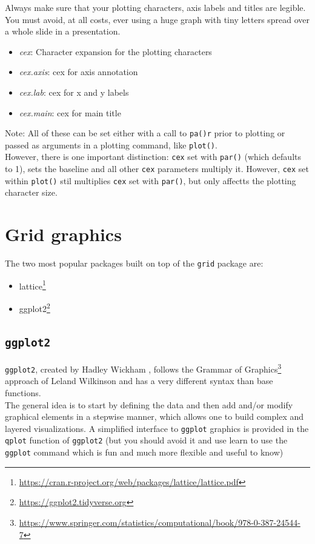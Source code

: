 \documentclass[
]{book}
\providecommand{\tightlist}{%
  \setlength{\itemsep}{0pt}\setlength{\parskip}{0pt}}
\renewcommand{\href}[2]{#2\footnote{\url{#1}}}
\begin{document}
Always make sure that your plotting characters, axis labels and titles are legible. You must avoid, at all costs, ever using a huge graph with tiny letters spread over a whole slide in a presentation.

\begin{itemize}
\tightlist
\item
  \emph{cex}: Character expansion for the plotting characters
\item
  \emph{cex.axis}: cex for axis annotation
\item
  \emph{cex.lab}: cex for x and y labels
\item
  \emph{cex.main}: cex for main title
\end{itemize}

Note: All of these can be set either with a call to \texttt{pa()r} prior to plotting or passed as arguments in a plotting command, like \texttt{plot()}.\\
However, there is one important distinction: \texttt{cex} set with \texttt{par()} (which defaults to 1), sets the baseline and all other \texttt{cex} parameters multiply it. However, \texttt{cex} set within \texttt{plot()} stil multiplies \texttt{cex} set with \texttt{par()}, but only affectts the plotting character size.

\hypertarget{grid-graphics}{%
\section{Grid graphics}\label{grid-graphics}}

The two most popular packages built on top of the \texttt{grid} package are:

\begin{itemize}
\tightlist
\item
  \href{https://cran.r-project.org/web/packages/lattice/lattice.pdf}{lattice}
\item
  \href{https://ggplot2.tidyverse.org}{ggplot2} \citep{wickham2011ggplot2}
\end{itemize}

\hypertarget{ggplot2}{%
\subsection{\texorpdfstring{\texttt{ggplot2}}{ggplot2}}\label{ggplot2}}

\texttt{ggplot2}, created by Hadley Wickham \citep{wickham2011ggplot2}, follows the \href{https://www.springer.com/statistics/computational/book/978-0-387-24544-7}{Grammar of Graphics} approach of Leland Wilkinson \citep{wilkinson2012grammar} and has a very different syntax than base functions.\\
The general idea is to start by defining the data and then add and/or modify graphical elements in a stepwise manner, which allows one to build complex and layered visualizations. A simplified interface to \texttt{ggplot} graphics is provided in the \texttt{qplot} function of \texttt{ggplot2} (but you should avoid it and use learn to use the \texttt{ggplot} command which is fun and much more flexible and useful to know)
\end{document}

